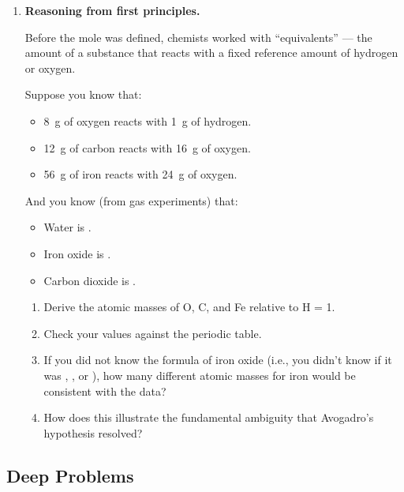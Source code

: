 \documentclass[12pt, a4paper]{book}
\theoremstyle{definition}
\begin{document}
\begin{problembox}[title={Integration Problems}]
\begin{enumerate}[label=\textbf{I\arabic*.}]
  \item \textbf{Reasoning from first principles.}

        Before the mole was defined, chemists worked with
        ``equivalents'' --- the amount of a substance that
        reacts with a fixed reference amount of hydrogen
        or oxygen.

        Suppose you know that:
        \begin{itemize}[nosep, leftmargin=2em]
          \item \SI{8}{\gram} of oxygen reacts with \SI{1}{\gram} of hydrogen.
          \item \SI{12}{\gram} of carbon reacts with \SI{16}{\gram} of oxygen.
          \item \SI{56}{\gram} of iron reacts with \SI{24}{\gram} of oxygen.
        \end{itemize}

        And you know (from gas experiments) that:
        \begin{itemize}[nosep, leftmargin=2em]
          \item Water is .
          \item Iron oxide is .
          \item Carbon dioxide is .
        \end{itemize}

        \begin{enumerate}[label=(\alph*)]
          \item Derive the atomic masses of O, C, and Fe
                relative to H = 1.
          \item Check your values against the periodic table.
          \item If you did not know the formula of iron oxide
                (i.e., you didn't know if it was ,
                , or ),
                how many different atomic masses for iron
                would be consistent with the data?
          \item How does this illustrate the fundamental
                ambiguity that Avogadro's hypothesis resolved?
        \end{enumerate}
\end{enumerate}
\end{problembox}

\subsection*{Deep Problems}
\end{document}
